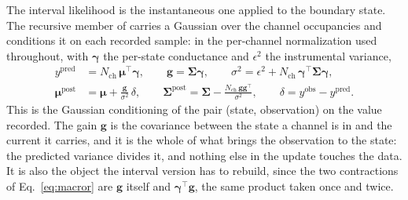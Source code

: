The interval likelihood is the instantaneous one applied to the boundary state. The recursive
member of \citet{moffatt2007estimation} carries a Gaussian over the channel occupancies and
conditions it on each recorded sample: in the per-channel normalization used throughout, with
$\bm{\gamma}$ the per-state conductance and $\epsilon^2$ the instrumental variance,
\begin{align}
  y^{\mathrm{pred}} &= N_{\mathrm{ch}}\,\bm{\mu}^\top\bm{\gamma},
  \qquad
  \mathbf{g} = \bm{\Sigma}\bm{\gamma},
  \qquad
  \sigma^2 = \epsilon^2 + N_{\mathrm{ch}}\,\bm{\gamma}^\top\bm{\Sigma}\bm{\gamma},
  \nonumber\\
  \bm{\mu}^{\mathrm{post}} &= \bm{\mu} + \frac{\mathbf{g}}{\sigma^2}\,\delta,
  \qquad
  \bm{\Sigma}^{\mathrm{post}} = \bm{\Sigma} - \frac{N_{\mathrm{ch}}\,\mathbf{g}\mathbf{g}^\top}{\sigma^2},
  \qquad
  \delta = y^{\mathrm{obs}} - y^{\mathrm{pred}}.
  \label{eq:macror}
\end{align}
This is the Gaussian conditioning of the pair (state, observation) on the value recorded. The
gain $\mathbf{g}$ is the covariance between the state a channel is in and the current it
carries, and it is the whole of what brings the observation to the state: the predicted
variance divides it, and nothing else in the update touches the data. It is also the object
the interval version has to rebuild, since the two contractions of Eq.~\ref{eq:macror} are
$\mathbf{g}$ itself and $\bm{\gamma}^\top\mathbf{g}$, the same product taken once and twice.
